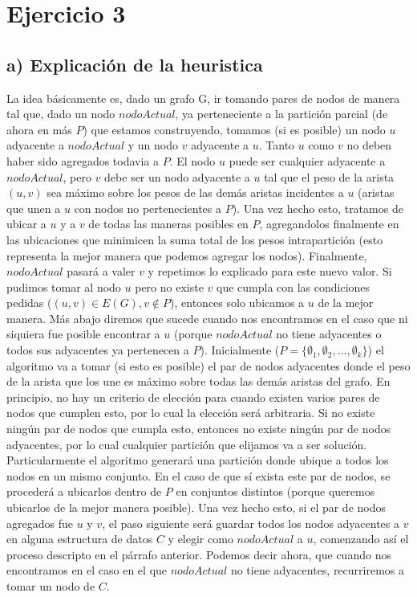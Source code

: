 \documentclass[a4paper]{article}
\begin{document}
\section{Ejercicio 3}
\subsection*{a) Explicación de la heuristica}
La idea básicamente es, dado un grafo G, ir tomando pares de nodos de manera tal que, dado un nodo $nodoActual$, ya perteneciente a la partición parcial (de ahora en más $P$) que estamos construyendo, tomamos (si es posible) un nodo $u$ adyacente a $nodoActual$ y un nodo $v$ adyacente a $u$. Tanto $u$ como $v$ no deben haber sido agregados todavia a $P$. El nodo $u$ puede ser cualquier adyacente a $nodoActual$, pero $v$ debe ser un nodo adyacente a $u$ tal que el peso de la arista $(u, v)$ sea máximo sobre los pesos de las demás aristas incidentes a $u$ (aristas que unen a $u$ con nodos no pertenecientes a $P$). Una vez hecho esto, tratamos de ubicar a $u$ y a $v$ de todas las maneras posibles en $P$, agregandolos finalmente en las ubicaciones que minimicen la suma total de los pesos intrapartición (esto representa la mejor manera que podemos agregar los nodos). Finalmente, $nodoActual$ pasará a valer $v$ y repetimos lo explicado para este nuevo valor. Si pudimos tomar al nodo $u$ pero no existe $v$ que cumpla con las condiciones pedidas ($(u, v) \in E(G), v \notin P$), entonces solo ubicamos a $u$ de la mejor manera. Más abajo diremos que sucede cuando nos encontramos en el caso que ni siquiera fue posible encontrar a $u$ (porque $nodoActual$ no tiene adyacentes o todos sus adyacentes ya pertenecen a $P$).
\newline Inicialmente ($P = \{\emptyset_1, \emptyset_2, ..., \emptyset_k\}$) el algoritmo va a tomar (si esto es posible) el par de nodos adyacentes donde el peso de la arista que los une es máximo sobre todas las demás aristas del grafo. En principio, no hay un criterio de elección para cuando existen varios pares de nodos que cumplen esto, por lo cual la elección será arbitraria. Si no existe ningún par de nodos que cumpla esto, entonces no existe ningún par de nodos adyacentes, por lo cual cualquier partición que elijamos va a ser solución. Particularmente el algoritmo generará una partición donde ubique a todos los nodos en un mismo conjunto. En el caso de que sí exista este par de nodos, se procederá a ubicarlos dentro de $P$ en conjuntos distintos (porque queremos ubicarlos de la mejor manera posible). Una vez hecho esto, si el par de nodos agregados fue $u$ y $v$, el paso siguiente será guardar todos los nodos adyacentes a $v$ en alguna estructura de datos $C$ y elegir como $nodoActual$ a $u$, comenzando así el proceso descripto en el párrafo anterior. Podemos decir ahora, que cuando nos encontramos en el caso en el que $nodoActual$ no tiene adyacentes, recurriremos a tomar un nodo de $C$.
\end{document}

